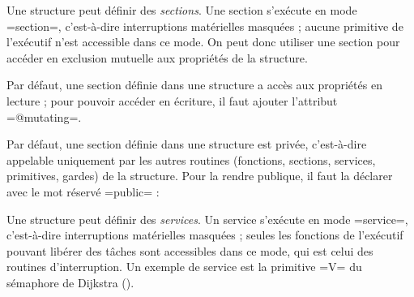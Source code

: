 

Une structure peut définir des \emph{sections}. Une section s'exécute en mode \plm=section=, c'est-à-dire interruptions matérielles masquées ; aucune primitive de l'exécutif n'est accessible dans ce mode. On peut donc utiliser une section pour accéder en exclusion mutuelle aux propriétés de la structure.

Par défaut, une section définie dans une structure a accès aux propriétés en lecture ; pour pouvoir accéder en écriture, il faut ajouter l'attribut \plm=@mutating=.


Par défaut, une section définie dans une structure est privée, c'est-à-dire appelable uniquement par les autres routines (fonctions, sections, services, primitives, gardes) de la structure. Pour la rendre publique, il faut la déclarer avec le mot réservé \plm=public= :










Une structure peut définir des \emph{services}. Un service s'exécute en mode \plm=service=, c'est-à-dire interruptions matérielles masquées ; seules les fonctions de l'exécutif pouvant libérer des tâches sont accessibles dans ce mode, qui est celui des routines d'interruption. Un exemple de service est la primitive \plm=V= du sémaphore de Dijkstra ().

